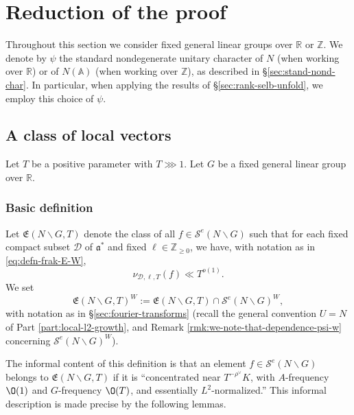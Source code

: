 \section{Reduction of the proof}\label{sec:reduction-proof}
Throughout this section we consider fixed general linear groups over $\mathbb{R}$ or $\mathbb{Z}$.  We denote by $\psi$ the standard nondegenerate unitary character of $N$ (when working over $\mathbb{R}$) or of $N(\mathbb{A})$ (when  working over $\mathbb{Z}$), as described in \S\ref{sec:stand-nond-char}.  In particular, when applying the results of \S\ref{sec:rank-selb-unfold}, we employ this choice of $\psi$.

\subsection{A class of local vectors}
Let $T$ be a positive parameter with $T \ggg 1$.  Let $G$ be a fixed general linear group over $\mathbb{R}$.

\subsubsection{Basic definition}

\begin{definition}
  Let $\mathfrak{E}(N \backslash G, T)$  denote the class of all $f \in \mathcal{S}^e(N \backslash G)$ such that for each fixed compact subset $\mathcal{D}$ of $\mathfrak{a}^*$ and fixed $\ell \in \mathbb{Z}_{\geq 0}$, we have, with notation as in \eqref{eq:defn-frak-E-W},
  \begin{equation*}
    \nu_{\mathcal{D},\ell,T}(f) \ll T^{o(1)}.
  \end{equation*}
  We set
  \begin{equation}\label{eq:defn-frak-E-W}
    \mathfrak{E}(N \backslash G, T)^W := \mathfrak{E}(N \backslash G, T) \cap \mathcal{S}^e(N \backslash G)^W,
  \end{equation}
  with notation as in \S\ref{sec:fourier-transforms} (recall the general convention $U = N$ of Part \ref{part:local-l2-growth}, and Remark \ref{rmk:we-note-that-dependence-psi-w} concerning $\mathcal{S}^e(N \backslash G)^W$).
\end{definition}

The informal content of this definition is that an element $f \in \mathcal{S}^e(N \backslash G)$ belongs to $\mathfrak{E}(N \backslash G, T)$ if it is ``concentrated near $T^{-\rho^\vee} K$, with $A$-frequency $\O(1)$ and $G$-frequency $\O(T)$, and essentially $L^2$-normalized.''  This informal description is made precise by the following lemmas.

